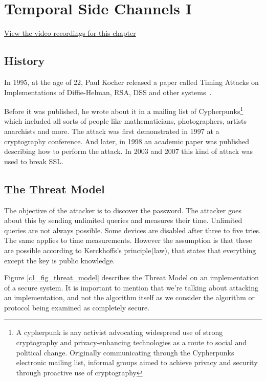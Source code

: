 \chapter{Temporal Side Channels I}\label{chap:c2_TemporalSC1}

\href{https://orenlab.sise.bgu.ac.il/AttacksonImplementationsCourseBook/#lecture-2---temporal-side-channels-i}{View the video recordings for this chapter}

\section{History}
In 1995, at the age of 22, Paul Kocher released a paper called Timing Attacks on
Implementations of Diffie-Helman, RSA, DSS and other
systems~\cite{kocher1996timing}.

Before it was published, he wrote about it in a mailing list of
Cypherpunks\footnote{A cypherpunk is any activist advocating widespread use of
strong cryptography and privacy-enhancing technologies as a route to social and
political change. Originally communicating through the Cypherpunks electronic
mailing list, informal groups aimed to achieve privacy and security through
proactive use of cryptography} which included all sorts of people like
mathematicians, photographers, artists anarchists and more. The attack was first
demonstrated in 1997 at a cryptography conference. And later, in 1998 an
academic paper was published describing how to perform the attack.
In 2003 and 2007 this kind of attack was used to break SSL.



\section{The Threat Model}
The objective of the attacker is to discover the password. The attacker goes about this by sending
unlimited queries and measures their time.
Unlimited queries are not always possible. Some devices are disabled after three to five tries.
The same applies to time measurements.
However the assumption is that these are possible according to Kerckhoffs's principle(law), 
that states that everything except the key is public knowledge. 

Figure \ref{c1_fig_threat_model} describes the Threat Model on an implementation
of a secure system. It is important to mention that we're talking about
attacking an implementation, and not the algorithm itself as we consider the
algorithm or protocol being examined as completely secure.

